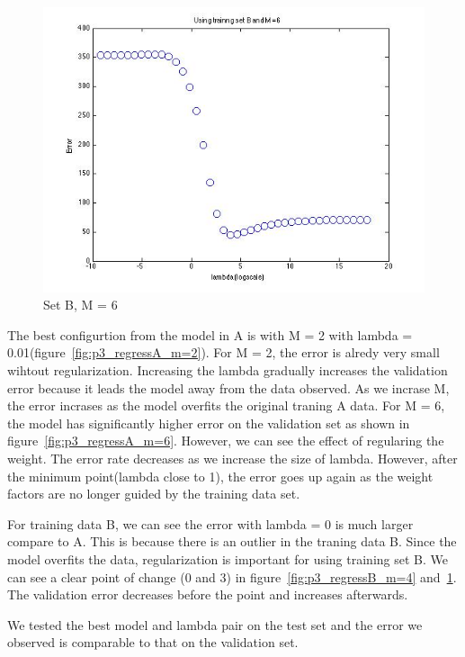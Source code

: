 \begin{figure}[!htb]
  \includegraphics[width=\linewidth]{figures/p3_regressB_m=6}
  \caption{Set B, M = 6}\label{fig:p3_regressB_m=6}
\endminipage
\end{figure}


The best configurtion from the model in A is with M = 2 with lambda = 0.01(figure~\ref{fig:p3_regressA_m=2}). For M = 2, the error is alredy very small wihtout regularization. Increasing the lambda gradually increases the validation error because it leads the model away from the data observed. As we incrase M, the error incrases as the model overfits the original traning A data. For M = 6, the model has significantly higher error on the validation set as shown in figure~\ref{fig:p3_regressA_m=6}.  However, we 
can see the effect of regularing the weight. The error rate decreases as we increase the size of lambda. However, after the minimum point(lambda close to 1), the error goes up again as the weight factors are no longer guided by the training data set. 

For training data B, we can see the error with lambda = 0 is much larger compare to A. This is because there is an outlier in the traning data B. Since the model overfits the data, regularization is important for using training set B. We can see a clear point of change (0 and 3) in figure~\ref{fig:p3_regressB_m=4} and~\ref{fig:p3_regressB_m=6}. The validation error decreases before the point and increases afterwards. 

We tested the best model and lambda pair on the test set and the error we observed is comparable to that on the validation set. 

